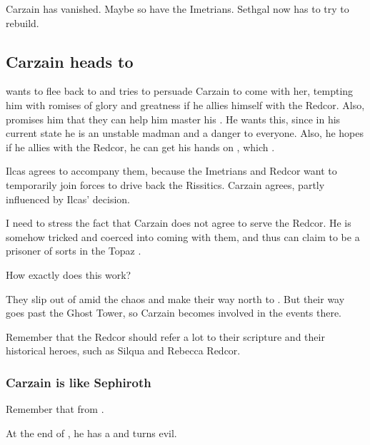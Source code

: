 Carzain has vanished.
Maybe so have the Imetrians. 
Sethgal now has to try to rebuild. 










\subsection{Carzain heads to \Redce}
\Esmerel{} wants to flee back to \Redce{} and tries to persuade Carzain to come with her, tempting him with romises of glory and greatness if he allies himself with the Redcor. 
Also, \Esmerel{} promises him that they can help him master his . 
He wants this, since in his current state he is an unstable madman and a danger to everyone. 
Also, he hopes if he allies with the Redcor, he can get his hands on , which . 

Ilcas agrees to accompany them, because the Imetrians and Redcor want to temporarily join forces to drive back the Rissitics. Carzain agrees, partly influenced by Ilcas' decision. 

I need to stress the fact that Carzain does not agree to serve the Redcor. He is somehow tricked and coerced into coming with them, and thus can claim to be a prisoner of sorts in the Topaz \Chateau. 

How exactly does this work?

They slip out of \Forclin{} amid the chaos and make their way north to \Redce{}. 
But their way goes past the Ghost Tower, so Carzain becomes involved in the events there. 

Remember that the Redcor should refer a lot to their scripture and their historical heroes, such as Silqua and Rebecca Redcor. 





\subsubsection{Carzain is like Sephiroth}
Remember that  from \cite{VideoGame:FinalFantasyVII}. 

At the end of \TwilightAngelRememberEmph, he has a  and turns evil. 

